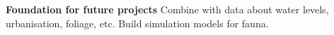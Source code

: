 \documentclass[a4paper,10pt,twocolumn]{article}
\newcommand{\hdg}[1] {\noindent \textbf{#1} }
\begin{document}
\hdg{Foundation for future projects}
Combine with data about water levels, urbanisation, foliage, etc. Build simulation models for fauna.


% 
% 
% 
% 
% 
% 
% 
% 



\vspace{-1em}
% 
{ \footnotesize }

\end{document}
